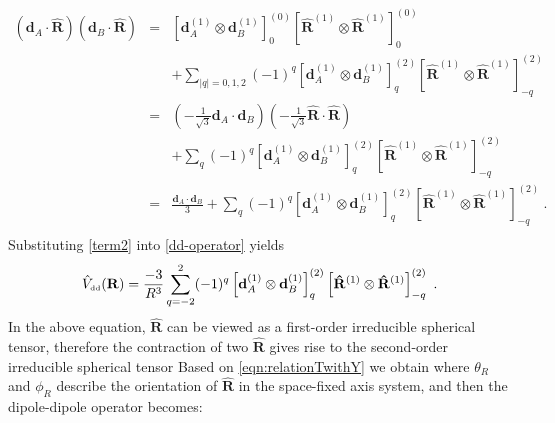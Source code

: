 \begin{eqnarray}
(\mathbf{d}_{A}\cdot \mathbf{\hat{R} })(\mathbf{d}_{B}\cdot\mathbf{\hat{R} })&=&\left[ \mathbf{d}_{A}^{(1)} \otimes \mathbf{d}_{B}^{(1)} \right]^{(0)}_{0} \left[ \mathbf{\hat{R}}^{(1)} \otimes \mathbf{\hat{R}}^{(1)} \right]^{(0)}_{0} \nonumber \\
& & + \sum_{|q|=0,1,2} (-1)^{q} \left[ \mathbf{d}_{A}^{(1)} \otimes \mathbf{d}_{B}^{(1)} \right]^{(2)}_{q} \left[ \mathbf{\hat{R}}^{(1)} \otimes \mathbf{\hat{R}}^{(1)} \right]^{(2)}_{-q} \nonumber \\
&=& (-\frac{1}{\sqrt{3}} \mathbf{d}_{A}\cdot \mathbf{d}_{B})(-\frac{1}{\sqrt{3}}\mathbf{\hat{R}}\cdot\mathbf{\hat{R}} ) \nonumber \\
& & +  \sum_{q} (-1)^{q} \left[ \mathbf{d}_{A}^{(1)} \otimes \mathbf{d}_{B}^{(1)} \right]^{(2)}_{q} \left[ \mathbf{\hat{R}}^{(1)} \otimes \mathbf{\hat{R}}^{(1)} \right]^{(2)}_{-q} \nonumber \\
&=& \frac{\mathbf{d}_{A}\cdot \mathbf{d}_{B}}{3}+  \sum_{q} (-1)^{q} \left[ \mathbf{d}_{A}^{(1)} \otimes \mathbf{d}_{B}^{(1)} \right]^{(2)}_{q} \left[ \mathbf{\hat{R}}^{(1)} \otimes \mathbf{\hat{R}}^{(1)} \right]^{(2)}_{-q} \  . \nonumber \\ 
\label{term2}
\end{eqnarray}
Substituting \autoref{term2} into \autoref{dd-operator} yields
\begin{equation}
\hat{V}_{\mbox{\tiny dd}}(\mathbf{R}) = \frac{-3}{R^{3}} \sum_{q=-2}^{2} (-1)^{q} \left[ \mathbf{d}_{A}^{(1)} \otimes \mathbf{d}_{B}^{(1)} \right]^{(2)}_{q} \left[ \mathbf{\hat{R}}^{(1)} \otimes \mathbf{\hat{R}}^{(1)} \right]^{(2)}_{-q} \ .
\end{equation}
In the above equation, $\mathbf{\hat{R}}$ can be viewed as a first-order irreducible spherical tensor, therefore the
contraction of two $\mathbf{\hat{R}}$ gives rise to the second-order  irreducible spherical tensor
Based on \autoref{eqn:relationTwithY} we obtain
where $\theta_{R}$ and $\phi_{R}$ describe the orientation of $\mathbf{\hat{R}}$ in the space-fixed axis system, and
then the dipole-dipole operator becomes:

